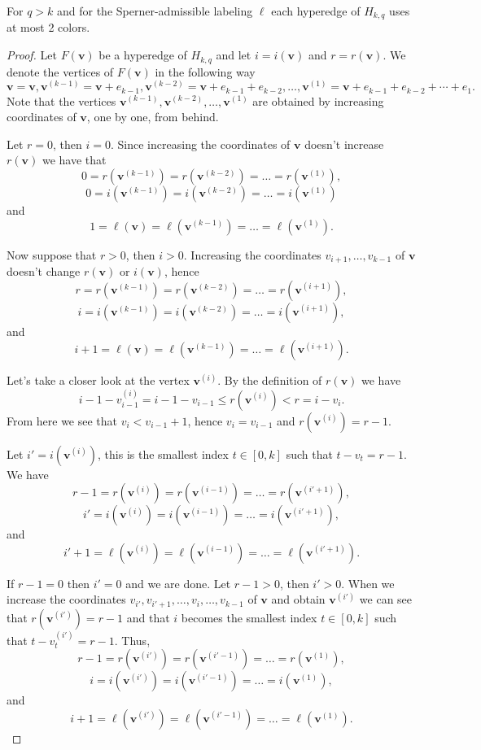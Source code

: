 \documentclass[10pt,a4paper]{amsart}
\begin{document}
\begin{theorem}
For $q>k$ and for the Sperner-admissible labeling $\ell$ each hyperedge of $H_{k,q}$ uses at most 2 colors. 
\end{theorem}

\begin{proof}
Let $F(\bm{v})$ be a hyperedge of $H_{k,q}$ and let $i=i(\bm{v})$ and $r=r(\bm{v})$. We denote the vertices of $F(\bm{v})$ in the following way
\[\bm{v}=\bm{v}, \bm{v}^{(k-1)}=\bm{v}+e_{k-1},\bm{v}^{(k-2)}=\bm{v}+e_{k-1}+e_{k-2},\ldots,\bm{v}^{(1)}=\bm{v}+e_{k-1}+e_{k-2}+\cdots+e_1.\]
Note that the vertices $\bm{v}^{(k-1)}, \bm{v}^{(k-2)},\ldots,\bm{v}^{(1)}$ are obtained by increasing coordinates of $\bm{v}$, one by one, from behind.

Let $r=0$, then $i=0$.  Since increasing the coordinates of $\bm{v}$ doesn't increase $r(\bm{v})$ we have that
\[0=r(\bm{v}^{(k-1)})=r(\bm{v}^{(k-2)})=\ldots=r(\bm{v}^{(1)}),\]
\[0=i(\bm{v}^{(k-1)})=i(\bm{v}^{(k-2)})=\ldots=i(\bm{v}^{(1)})\]
and
\[1=\ell(\bm{v})=\ell(\bm{v}^{(k-1)})=\ldots=\ell(\bm{v}^{(1)}).\]

Now suppose that $r>0$, then $i>0$. Increasing the coordinates $v_{i+1},\ldots,v_{k-1}$ of $\bm{v}$ doesn't change $r(\bm{v})$ or $i(\bm{v})$, hence
\[r=r(\bm{v}^{(k-1)})=r(\bm{v}^{(k-2)})=\ldots=r(\bm{v}^{(i+1)}),\]
\[i=i(\bm{v}^{(k-1)})=i(\bm{v}^{(k-2)})=\ldots=i(\bm{v}^{(i+1)}),\]
and
\[i+1=\ell(\bm{v})=\ell(\bm{v}^{(k-1)})=\ldots=\ell(\bm{v}^{(i+1)}).\]

Let's take a closer look at the vertex $\bm{v}^{(i)}$. By the definition of $r(\bm{v})$ we have
\[i-1-v^{(i)}_{i-1}=i-1-v_{i-1}\leq r(\bm{v}^{(i)})<r=i-v_i.\]
From here we see that $v_i<v_{i-1}+1$, hence $v_i=v_{i-1}$ and $r(\bm{v}^{(i)})=r-1$. 

Let $i'=i(\bm{v}^{(i)})$, this is the smallest index $t\in[0,k]$ such that $t-v_t=r-1$. We have 
\[r-1=r(\bm{v}^{(i)})=r(\bm{v}^{(i-1)})=\ldots=r(\bm{v}^{(i'+1)}),\]
\[i'=i(\bm{v}^{(i)})=i(\bm{v}^{(i-1)})=\ldots=i(\bm{v}^{(i'+1)}),\]
and  
\[i'+1=\ell(\bm{v}^{(i)})=\ell(\bm{v}^{(i-1)})=\ldots=\ell(\bm{v}^{(i'+1)}).\]

If $r-1=0$ then $i'=0$ and we are done. Let $r-1>0$, then $i'>0$. When we increase the coordinates $v_{i'},v_{i'+1},\ldots,v_{i},\ldots,v_{k-1}$ of $\bm{v}$ and obtain $\bm{v}^{(i')}$ we can see that $r(\bm{v}^{(i')})=r-1$ and that $i$ becomes the smallest index $t\in[0,k]$ such that $t-v^{(i')}_t=r-1$. Thus, 
\[r-1=r(\bm{v}^{(i')})=r(\bm{v}^{(i'-1)})=\ldots=r(\bm{v}^{(1)}),\]
\[i=i(\bm{v}^{(i')})=i(\bm{v}^{(i'-1)})=\ldots=i(\bm{v}^{(1)}),\]
and
\[i+1=\ell(\bm{v}^{(i')})=\ell(\bm{v}^{(i'-1)})=\ldots=\ell(\bm{v}^{(1)}).\]
\end{proof}
\end{document}
